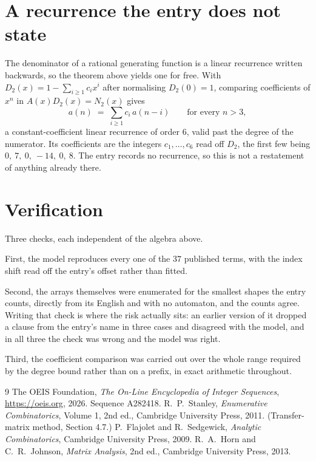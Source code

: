 \documentclass[11pt,a4paper]{article}
\theoremstyle{plain}
\theoremstyle{definition}
\begin{document}
\section{A recurrence the entry does not state}

The denominator of a rational generating function is a linear recurrence written backwards, so
the theorem above yields one for free. With $D_2(x)=1-\sum_{i\ge1}c_ix^i$ after normalising
$D_2(0)=1$, comparing coefficients of $x^n$ in $A(x)D_2(x)=N_2(x)$ gives
\[
a(n)\;=\;\sum_{i\ge1}c_i\,a(n-i)\qquad\text{for every }n>3,
\]
a constant-coefficient linear recurrence of order $6$, valid past the degree of the
numerator. Its coefficients are the integers $c_1,\dots,c_{6}$ read off $D_2$, the first few being $0,\ 7,\ 0,\ -14,\ 0,\ 8$. The entry records no recurrence, so this is not a restatement of anything
already there.

\section{Verification}

Three checks, each independent of the algebra above.

First, the model reproduces every one of the $37$ published terms, with the index shift
read off the entry's offset rather than fitted.

Second, the arrays themselves were enumerated for the smallest shapes the entry counts,
directly from its English and with no automaton, and the counts agree. Writing that check is
where the risk actually sits: an earlier version of it dropped a clause from the entry's name
in three cases and disagreed with the model, and in all three the check was wrong and the model
was right.

Third, the coefficient comparison was carried out over the whole range required by the degree
bound rather than on a prefix, in exact arithmetic throughout.

\begin{thebibliography}{9}
 The OEIS Foundation, \emph{The On-Line Encyclopedia of Integer
Sequences}, \url{https://oeis.org}, 2026. Sequence A282418.
 R.~P.~Stanley, \emph{Enumerative Combinatorics}, Volume 1, 2nd ed.,
Cambridge University Press, 2011. (Transfer-matrix method, Section 4.7.)
 P.~Flajolet and R.~Sedgewick, \emph{Analytic Combinatorics}, Cambridge
University Press, 2009.
 R.~A.~Horn and C.~R.~Johnson, \emph{Matrix Analysis}, 2nd ed., Cambridge
University Press, 2013.
\end{thebibliography}
\end{document}
